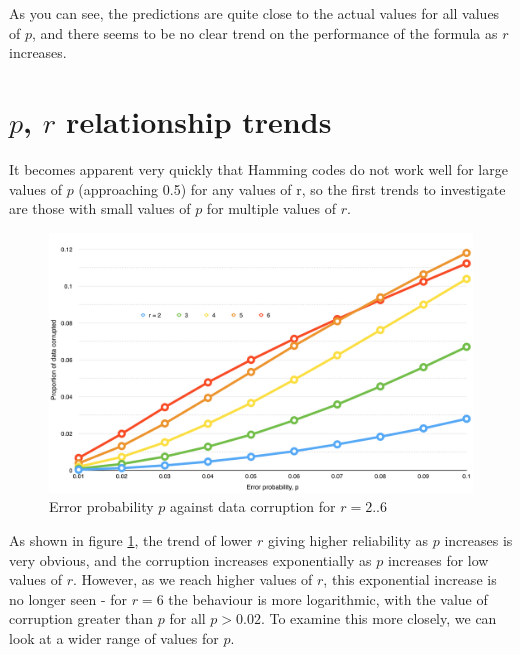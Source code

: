 \documentclass[a4paper,11pt]{article}
\begin{document}
        As you can see, the predictions are quite close to the actual values for all values of $p$, and there seems to be no clear trend on the performance of the formula as $r$ increases.

    \section{$p$, $r$ relationship trends}
        It becomes apparent very quickly that Hamming codes do not work well for large values of $p$ (approaching 0.5) for any values of r, so the first trends to investigate are those with small values of $p$ for multiple values of $r$.

        \begin{figure}[h]
            \caption{Error probability $p$ against data corruption for $r = 2..6$}
            \label{fig:graph1}
            \centering
            \includegraphics[width=\textwidth]{graph1}
        \end{figure}

        As shown in figure \ref{fig:graph1}, the trend of lower $r$ giving higher reliability as $p$ increases is very obvious, and the corruption increases exponentially as $p$ increases for low values of $r$. However, as we reach higher values of $r$, this exponential increase is no longer seen - for $r = 6$ the behaviour is more logarithmic, with the value of corruption greater than $p$ for all $p > 0.02$. To examine this more closely, we can look at a wider range of values for $p$.
\end{document}
